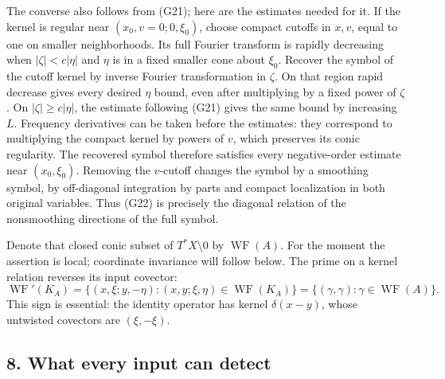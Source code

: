 \documentclass[
  11pt,
]{article}
\begin{document}
The converse also follows from (G21); here are the estimates needed for
it. If the kernel is regular near \((x_0,v=0;0,\xi_0)\), choose compact
cutoffs in \(x,v\), equal to one on smaller neighborhoods. Its full
Fourier transform is rapidly decreasing when \(|\zeta|<c|\eta|\) and
\(\eta\) is in a fixed smaller cone about \(\xi_0\). Recover the symbol
of the cutoff kernel by inverse Fourier transformation in \(\zeta\). On
that region rapid decrease gives every desired \(\eta\) bound, even
after multiplying by a fixed power of \(\zeta\). On
\(|\zeta|\geq c|\eta|\), the estimate following (G21) gives the same
bound by increasing \(L\). Frequency derivatives can be taken before the
estimates: they correspond to multiplying the compact kernel by powers
of \(v\), which preserves its conic regularity. The recovered symbol
therefore satisfies every negative-order estimate near \((x_0,\xi_0)\).
Removing the \(v\)-cutoff changes the symbol by a smoothing symbol, by
off-diagonal integration by parts and compact localization in both
original variables. Thus (G22) is precisely the diagonal relation of the
nonsmoothing directions of the full symbol.

Denote that closed conic subset of \(T^*X\setminus0\) by
\(\operatorname{WF}(A)\). For the moment the assertion is local;
coordinate invariance will follow below. The prime on a kernel relation
reverses its input covector: \[
\operatorname{WF}'(K_A)
=\{(x,\xi;y,-\eta):(x,y;\xi,\eta)\in\operatorname{WF}(K_A)\}
=\{(\gamma,\gamma):\gamma\in\operatorname{WF}(A)\}.
\tag{G23}
\] This sign is essential: the identity operator has kernel
\(\delta(x-y)\), whose untwisted covectors are \((\xi,-\xi)\).

\subsection{8. What every input can
detect}\label{what-every-input-can-detect}
\end{document}
